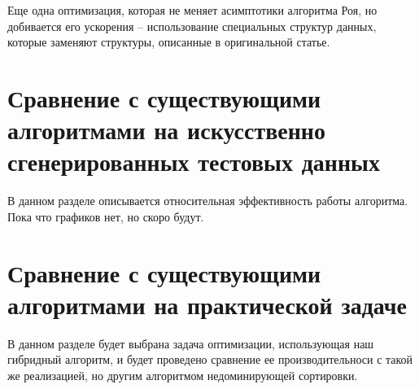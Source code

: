 Еще одна оптимизация, которая не меняет асимптотики алгоритма Роя, но добивается его ускорения -- использование
специальных структур данных, которые заменяют структуры, описанные в оригинальной статье.

\section{Сравнение с существующими алгоритмами на искусственно сгенерированных тестовых данных}

В данном разделе описывается относительная эффективность работы алгоритма. Пока что графиков нет, но скоро будут.

\section{Сравнение с существующими алгоритмами на практической задаче}

В данном разделе будет выбрана задача оптимизации, использующая наш гибридный алгоритм, и будет проведено сравнение
ее производительноси с такой же реализацией, но другим алгоритмом недоминирующей сортировки.


